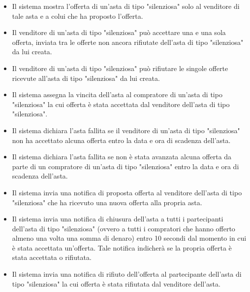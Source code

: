         \begin{itemize}
            \item Il sistema mostra l'offerta di un'asta di tipo "silenziosa" solo al venditore di tale asta e a colui che ha proposto l'offerta.
            \item Il venditore di un'asta di tipo "silenziosa" può accettare una e una sola offerta, inviata tra le offerte non ancora rifiutate dell'asta di tipo "silenziosa" da lui creata.
            \item Il venditore di un'asta di tipo "silenziosa" può rifiutare le singole offerte ricevute all'asta di tipo "silenziosa" da lui creata.
            \item Il sistema assegna la vincita dell'asta al compratore di un'asta di tipo "silenziosa" la cui offerta è stata accettata dal venditore dell'asta di tipo "silenziosa".
            \item Il sistema dichiara l'asta fallita se il venditore di un'asta di tipo "silenziosa" non ha accettato alcuna offerta entro la data e ora di scadenza dell'asta.
            \item Il sistema dichiara l'asta fallita se non è stata avanzata alcuna offerta da parte di un compratore di un'asta di tipo "silenziosa" entro la data e ora di scadenza dell'asta.
            \item Il sistema invia una notifica di proposta offerta al venditore dell'asta di tipo "silenziosa" che ha ricevuto una nuova offerta alla propria asta.
            \item Il sistema invia una notifica di chiusura dell'asta a tutti i partecipanti dell'asta di tipo "silenziosa" (ovvero a tutti i compratori che hanno offerto almeno una volta una somma di denaro) entro 10 secondi dal momento in cui è stata accettata un'offerta. Tale notifica indicherà se la propria offerta è stata accettata o rifiutata.
            \item Il sistema invia una notifica di rifiuto dell'offerta al partecipante dell'asta di tipo "silenziosa" la cui offerta è stata rifiutata dal venditore dell'asta.
        \end{itemize}
